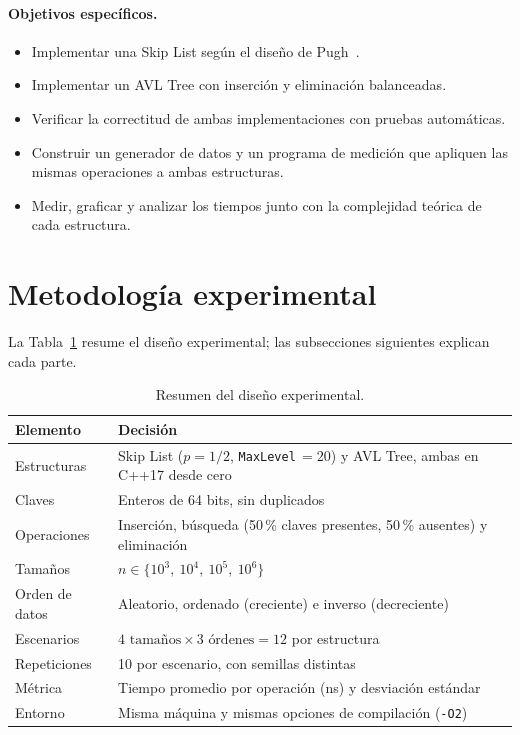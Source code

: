\documentclass[11pt,a4paper]{article}
\begin{document}
\paragraph{Objetivos específicos.}
\begin{itemize}
  \item[\textbf{O1.}] Implementar una Skip List según el diseño de Pugh~\cite{pugh1990}.
  \item[\textbf{O2.}] Implementar un AVL Tree con inserción y eliminación balanceadas.
  \item[\textbf{O3.}] Verificar la correctitud de ambas implementaciones con
  pruebas automáticas.
  \item[\textbf{O4.}] Construir un generador de datos y un programa de
  medición que apliquen las mismas operaciones a ambas estructuras.
  \item[\textbf{O5.}] Medir, graficar y analizar los tiempos junto con la
  complejidad teórica de cada estructura.
\end{itemize}

\section{Metodología experimental}\label{sec:metodo}

La Tabla~\ref{tab:diseno} resume el diseño experimental; las subsecciones
siguientes explican cada parte.

\begin{table}[!htb]
\centering
\renewcommand{\arraystretch}{1.2}
\begin{tabularx}{\textwidth}{l X}
\toprule
\textbf{Elemento} & \textbf{Decisión} \\
\midrule
Estructuras   & Skip List ($p=1/2$, \texttt{MaxLevel}$\,=20$) y AVL Tree, ambas en C++17 desde cero \\
Claves        & Enteros de 64 bits, sin duplicados \\
Operaciones   & Inserción, búsqueda (50\,\% claves presentes, 50\,\% ausentes) y eliminación \\
Tamaños       & $n \in \{10^3,\ 10^4,\ 10^5,\ 10^6\}$ \\
Orden de datos& Aleatorio, ordenado (creciente) e inverso (decreciente) \\
Escenarios    & $4 \text{ tamaños} \times 3 \text{ órdenes} = 12$ por estructura \\
Repeticiones  & 10 por escenario, con semillas distintas \\
Métrica       & Tiempo promedio por operación (ns) y desviación estándar \\
Entorno       & Misma máquina y mismas opciones de compilación (\texttt{-O2}) \\
\bottomrule
\end{tabularx}
\caption{Resumen del diseño experimental.}
\label{tab:diseno}
\end{table}
\end{document}
